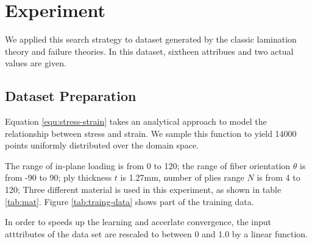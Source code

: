 \section{Experiment}
We applied this search strategy to dataset generated by the classic lamination
theory and failure theories. In this dataset, sixtheen attribues and two actual
values are given.
\subsection{Dataset Preparation}
Equation \ref{equ:stress-strain} takes an analytical approach to model the
relationship between stress and strain. We sample this function to yield 14000 points
uniformly distributed over the domain space.

The range of in-plane loading is from 0 to 120; the range of fiber orientation $\theta$ is from
-90 to 90; ply thickness $t$ is 1.27mm, number of plies range $N$ is from 4 to 120;
Three different material is used in this experiment, as shown in table \ref{tab:mat}.
Figure \ref{tab:traing-data} shows part of the training data.

In order to speeds up the learning and accerlate convergence, the input
atttributes of the data set are rescaled to between 0 and 1.0 by a linear function.




